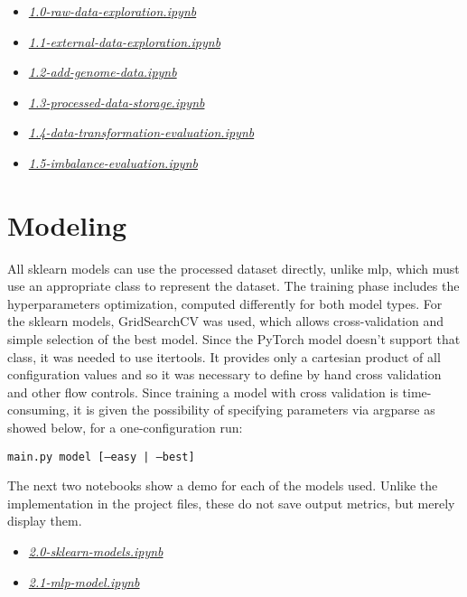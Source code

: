 \documentclass[../main]{subfiles}
\begin{document}
\begin{itemize}
    \item \href{https://github.com/prushh/movie-lens-mlp/blob/main/notebooks/1.0-raw-data-exploration.ipynb}{\textit{1.0-raw-data-exploration.ipynb}}
    \item \href{https://github.com/prushh/movie-lens-mlp/blob/main/notebooks/1.1-external-data-exploration.ipynb}{\textit{1.1-external-data-exploration.ipynb}}
    \item \href{https://github.com/prushh/movie-lens-mlp/blob/main/notebooks/1.2-add-genome-data.ipynb}{\textit{1.2-add-genome-data.ipynb}}
    \item \href{https://github.com/prushh/movie-lens-mlp/blob/main/notebooks/1.3-processed-data-storage.ipynb}{\textit{1.3-processed-data-storage.ipynb}}
    \item \href{https://github.com/prushh/movie-lens-mlp/blob/main/notebooks/1.4-data-transformation-evaluation.ipynb}{\textit{1.4-data-transformation-evaluation.ipynb}}
    \item \href{https://github.com/prushh/movie-lens-mlp/blob/main/notebooks/1.5-imbalance-evaluation.ipynb}{\textit{1.5-imbalance-evaluation.ipynb}}
\end{itemize}

\section{Modeling}
All sklearn models can use the processed dataset directly, unlike mlp, which must use an appropriate class to represent the dataset.
The training phase includes the hyperparameters optimization, computed differently for both model types.
For the sklearn models, GridSearchCV was used, which allows cross-validation and simple selection of the best model.
Since the PyTorch model doesn't support that class, it was needed to use itertools.
It provides only a cartesian product of all configuration values and so it was necessary to define by hand cross validation and other flow controls.
Since training a model with cross validation is time-consuming, it is given the possibility of specifying parameters via argparse as showed below, for a one-configuration run:
\begin{center}
    \texttt{main.py model [--easy | --best]}
\end{center}

The next two notebooks show a demo for each of the models used.
Unlike the implementation in the project files, these do not save output metrics, but merely display them.
\begin{itemize}
    \item \href{https://github.com/prushh/movie-lens-mlp/blob/main/notebooks/2.0-sklearn-models.ipynb}{\textit{2.0-sklearn-models.ipynb}}
    \item \href{https://github.com/prushh/movie-lens-mlp/blob/main/notebooks/2.1-mlp-model.ipynb}{\textit{2.1-mlp-model.ipynb}}
\end{itemize}
\end{document}
